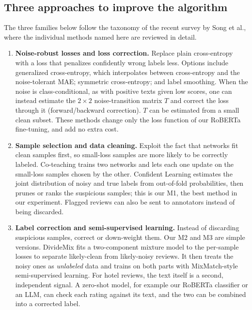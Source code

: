 \subsection{Three approaches to improve the algorithm}
The three families below follow the taxonomy of the recent survey by Song et al.\cite{song2023learning}, where the individual methods named here are reviewed in detail.
\begin{enumerate}
  \item \textbf{Noise-robust losses and loss correction.} Replace plain cross-entropy with a loss that penalizes confidently wrong labels less. Options include generalized cross-entropy, which interpolates between cross-entropy and the noise-tolerant MAE; symmetric cross-entropy; and label smoothing.
  When the noise is class-conditional, as with positive texts given low scores, one can instead estimate the $2\times2$ noise-transition matrix $T$ and correct the loss through it (forward/backward correction). $T$ can be estimated from a small clean subset.
  These methods change only the loss function of our RoBERTa fine-tuning, and add no extra cost.

  \item \textbf{Sample selection and data cleaning.} Exploit the fact that networks fit clean samples first, so small-loss samples are more likely to be correctly labeled.
  Co-teaching trains two networks and lets each one update on the small-loss samples chosen by the other. Confident Learning estimates the joint distribution of noisy and true labels from out-of-fold probabilities, then prunes or ranks the suspicious samples\cite{northcutt2021confident}; this is our M1, the best method in our experiment.
  Flagged reviews can also be sent to annotators instead of being discarded.

  \item \textbf{Label correction and semi-supervised learning.} Instead of discarding suspicious samples, correct or down-weight them. Our M2 and M3 are simple versions.
  DivideMix fits a two-component mixture model to the per-sample losses to separate likely-clean from likely-noisy reviews. It then treats the noisy ones as \emph{unlabeled} data and trains on both parts with MixMatch-style semi-supervised learning.
  For hotel reviews, the text itself is a second, independent signal. A zero-shot model, for example our RoBERTa classifier or an LLM, can check each rating against its text, and the two can be combined into a corrected label.
\end{enumerate}

